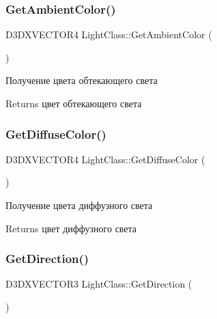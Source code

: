 \subsubsection{\texorpdfstring{Get\+Ambient\+Color()}{GetAmbientColor()}}
{\footnotesize\ttfamily D3\+D\+X\+V\+E\+C\+T\+O\+R4 Light\+Class\+::\+Get\+Ambient\+Color (\begin{DoxyParamCaption}{ }\end{DoxyParamCaption})}



Получение цвета обтекающего света 

\begin{DoxyReturn}{Returns}
цвет обтекающего света 
\end{DoxyReturn}
\mbox{\label{class_light_class_a93a1bb92f155978b8bf87c936d3e509c}} 
\subsubsection{\texorpdfstring{Get\+Diffuse\+Color()}{GetDiffuseColor()}}
{\footnotesize\ttfamily D3\+D\+X\+V\+E\+C\+T\+O\+R4 Light\+Class\+::\+Get\+Diffuse\+Color (\begin{DoxyParamCaption}{ }\end{DoxyParamCaption})}



Получение цвета диффузного света 

\begin{DoxyReturn}{Returns}
цвет диффузного света 
\end{DoxyReturn}
\mbox{\label{class_light_class_aab07422c64d1a4388b0055f532235dcc}} 
\subsubsection{\texorpdfstring{Get\+Direction()}{GetDirection()}}
{\footnotesize\ttfamily D3\+D\+X\+V\+E\+C\+T\+O\+R3 Light\+Class\+::\+Get\+Direction (\begin{DoxyParamCaption}{ }\end{DoxyParamCaption})}



